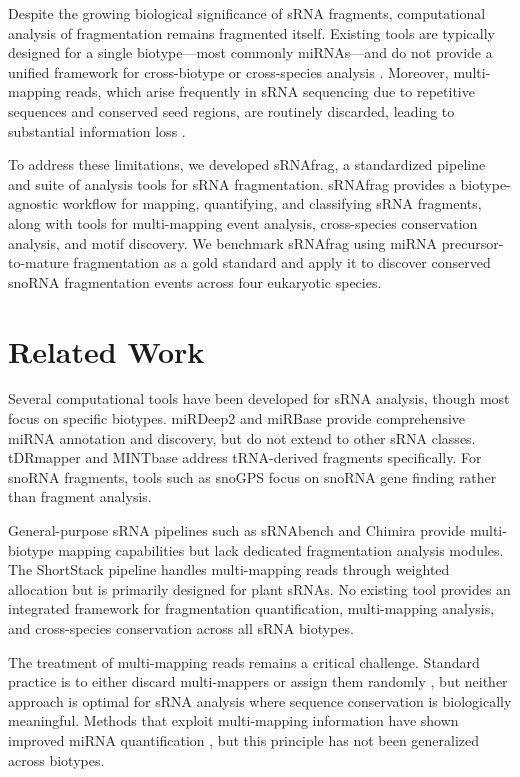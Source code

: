 \documentclass[11pt]{article}
\begin{document}
Despite the growing biological significance of sRNA fragments, computational analysis of fragmentation remains fragmented itself. Existing tools are typically designed for a single biotype---most commonly miRNAs---and do not provide a unified framework for cross-biotype or cross-species analysis \citep{friedlander2012,kozomara2019,shi2021}. Moreover, multi-mapping reads, which arise frequently in sRNA sequencing due to repetitive sequences and conserved seed regions, are routinely discarded, leading to substantial information loss \citep{axtell2014,johnson2016}.

To address these limitations, we developed sRNAfrag, a standardized pipeline and suite of analysis tools for sRNA fragmentation. sRNAfrag provides a biotype-agnostic workflow for mapping, quantifying, and classifying sRNA fragments, along with tools for multi-mapping event analysis, cross-species conservation analysis, and motif discovery. We benchmark sRNAfrag using miRNA precursor-to-mature fragmentation as a gold standard and apply it to discover conserved snoRNA fragmentation events across four eukaryotic species.

\section{Related Work}

Several computational tools have been developed for sRNA analysis, though most focus on specific biotypes. miRDeep2 \citep{friedlander2012} and miRBase \citep{kozomara2019} provide comprehensive miRNA annotation and discovery, but do not extend to other sRNA classes. tDRmapper \citep{selitsky2015} and MINTbase \citep{pliatsika2018} address tRNA-derived fragments specifically. For snoRNA fragments, tools such as snoGPS \citep{schattner2004} focus on snoRNA gene finding rather than fragment analysis.

General-purpose sRNA pipelines such as sRNAbench \citep{barturen2014} and Chimira \citep{vitsios2015} provide multi-biotype mapping capabilities but lack dedicated fragmentation analysis modules. The ShortStack pipeline \citep{axtell2013} handles multi-mapping reads through weighted allocation but is primarily designed for plant sRNAs. No existing tool provides an integrated framework for fragmentation quantification, multi-mapping analysis, and cross-species conservation across all sRNA biotypes.

The treatment of multi-mapping reads remains a critical challenge. Standard practice is to either discard multi-mappers or assign them randomly \citep{johnson2016}, but neither approach is optimal for sRNA analysis where sequence conservation is biologically meaningful. Methods that exploit multi-mapping information have shown improved miRNA quantification \citep{liao2014}, but this principle has not been generalized across biotypes.
\end{document}
